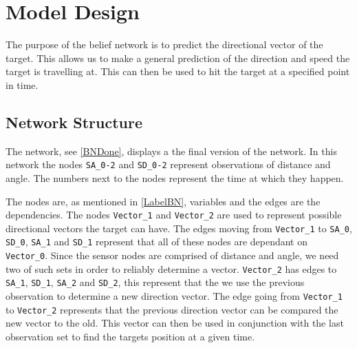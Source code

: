 \chapter{Model Design}

The purpose of the belief network is to predict the directional vector of the
target. This allows us to make a general prediction of the direction and speed
the target is travelling at. This can then be used to hit the target at a
specified point in time. 


\section{Network Structure}
The network, see \autoref{BNDone}, displays a the final version of the network.
In this network the nodes \texttt{SA\_0-2} and \texttt{SD\_0-2} represent
observations of distance and angle. The numbers next to the nodes represent the
time at which they happen.



The nodes are, as mentioned in \autoref{LabelBN}, variables and the edges are
the dependencies. The nodes \texttt{Vector\_1} and \texttt{Vector\_2} are used
to represent possible directional vectors the target can have. The edges moving
from \texttt{Vector\_1} to \texttt{SA\_0}, \texttt{SD\_0}, \texttt{SA\_1} and
\texttt{SD\_1} represent that all of these nodes are dependant on
\texttt{Vector\_0}. 
Since the sensor nodes are comprised of distance and angle, we need two
of such sets in order to reliably determine a vector. \texttt{Vector\_2} has
edges to \texttt{SA\_1}, \texttt{SD\_1}, \texttt{SA\_2} and
\texttt{SD\_2}, this represent that the we use the
previous observation to determine a new direction vector. The edge going from
 \texttt{Vector\_1} to \texttt{Vector\_2} represents that the previous direction
vector can be compared the new vector to the old. This vector can then be used
in conjunction with the last observation set to find the targets position at a
given time.